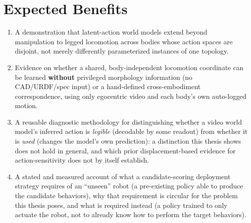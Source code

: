 \documentclass[12pt,a4paper,oneside]{report}
\begin{document}
\section{Expected Benefits}
\begin{enumerate}[label=\arabic*.]
\item A demonstration that latent-action world models extend beyond manipulation to legged locomotion across
  bodies whose action spaces are disjoint, not merely differently parameterized instances of one
  topology.
\item Evidence on whether a shared, body-independent locomotion coordinate can be learned \textbf{without}
  privileged morphology information (no CAD/URDF/spec input) or a hand-defined cross-embodiment correspondence,
  using only egocentric video and each body's own auto-logged motion.
\item A reusable diagnostic methodology for distinguishing whether a video world model's inferred action is
  \emph{legible} (decodable by some readout) from whether it is \emph{used} (changes the model's own
  prediction): a distinction this thesis shows does not hold in general, and which prior displacement-based
  evidence for action-sensitivity does not by itself establish.
\item A stated and measured account of what a candidate-scoring deployment strategy requires of an ``unseen''
  robot (a pre-existing policy able to produce the candidate behaviors), why that requirement is circular for
  the problem this thesis poses, and what is required instead (a policy trained to only actuate the robot, not
  to already know how to perform the target behaviors).
\end{enumerate}
\end{document}
